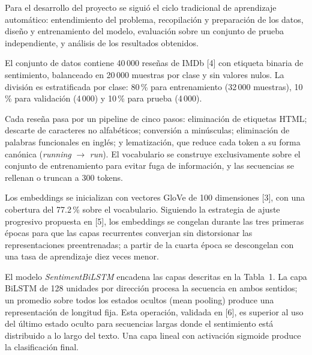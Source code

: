 \documentclass[letterpaper, 10pt, conference]{ieeeconf}
\begin{document}
Para el desarrollo del proyecto se sigui\'o el ciclo tradicional de aprendizaje
autom\'atico: entendimiento del problema, recopilaci\'on y preparaci\'on de los
datos, dise\~no y entrenamiento del modelo, evaluaci\'on sobre un conjunto de
prueba independiente, y an\'alisis de los resultados obtenidos.

El conjunto de datos contiene 40\,000 rese\~nas de IMDb [4] con etiqueta
binaria de sentimiento, balanceado en 20\,000 muestras por clase y sin valores
nulos. La divisi\'on es estratificada por clase: 80\,\% para entrenamiento
(32\,000 muestras), 10\,\% para validaci\'on (4\,000) y 10\,\% para prueba
(4\,000).

Cada rese\~na pasa por un pipeline de cinco pasos: eliminaci\'on de etiquetas
HTML; descarte de caracteres no alfab\'eticos; conversi\'on a min\'usculas;
eliminaci\'on de palabras funcionales en ingl\'es; y lematizaci\'on, que reduce
cada token a su forma can\'onica (\textit{running} $\to$ \textit{run}). El
vocabulario se construye exclusivamente sobre el conjunto de entrenamiento para
evitar fuga de informaci\'on, y las secuencias se rellenan o truncan a 300
tokens.

Los embeddings se inicializan con vectores GloVe de 100 dimensiones [3], con
una cobertura del 77.2\,\% sobre el vocabulario. Siguiendo la estrategia de
ajuste progresivo propuesta en [5], los embeddings se congelan durante las tres
primeras \'epocas para que las capas recurrentes converjan sin distorsionar las
representaciones preentrenadas; a partir de la cuarta \'epoca se descongelan
con una tasa de aprendizaje diez veces menor.

El modelo \textit{SentimentBiLSTM} encadena las capas descritas en la Tabla~1.
La capa BiLSTM de 128 unidades por direcci\'on procesa la secuencia en ambos
sentidos; un promedio sobre todos los estados ocultos (mean pooling) produce
una representaci\'on de longitud fija. Esta operaci\'on, validada en [6], es
superior al uso del \'ultimo estado oculto para secuencias largas donde el
sentimiento est\'a distribuido a lo largo del texto. Una capa lineal con
activaci\'on sigmoide produce la clasificaci\'on final.
\end{document}
